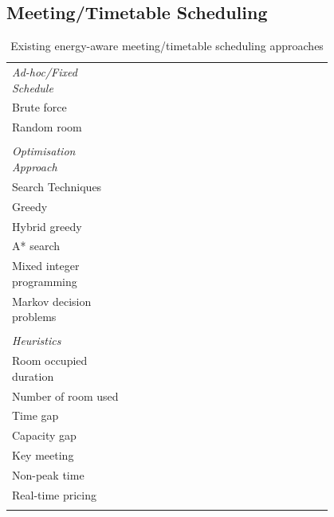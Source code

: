 \subsection{Meeting/Timetable Scheduling}

\begin{table}[t]
\centering
\begin{tabular}{p{0.3\linewidth} p{0.1\linewidth} p{0.08\linewidth}  p{0.08\linewidth} p{0.08\linewidth} p{0.08\linewidth} p{0.08\linewidth}}
\hline\centering{ } & \centering{\cite{majumdar2012energy}} & \centering{\cite{kwak2013tesla}} & \centering{\cite{pan2012thermal}} & \centering{\cite{klein2012coordinating}}  & \centering{\cite{chai2014minimizing}} & \centering{\cite{balaji2013zonepac}}\tabularnewline
\hline  \emph{Ad-hoc/Fixed Schedule} &  &  &  &  &  &  \tabularnewline
\hline  Brute force & \centering{x} &  &  &  &  &  \tabularnewline
\hline  Random room & \centering{x} &  &  & \centering{x} & \centering{x} & \centering{x} \tabularnewline
\hline   &  &  &  &  &  &  \tabularnewline
\hline  \emph{Optimisation Approach} &  &  &  &  &  &  \tabularnewline
\hline  Search Techniques &  &  &  &  &  &  \tabularnewline
\hline  \hspace{5pt} Greedy &  &  & \centering{x} &  &  &  \tabularnewline
\hline  \hspace{5pt} Hybrid greedy & \centering{x} &  &  &  &  &  \tabularnewline
\hline  \hspace{5pt} A* search & \centering{x} &  &  &  &  &  \tabularnewline
\hline  Mixed integer programming &  & \centering{x} &  &  & \centering{x} &  \tabularnewline
\hline  Markov decision problems &  &  &  & \centering{x} &  &  \tabularnewline
\hline   &  &  &  &  &  &  \tabularnewline
\hline  \emph{Heuristics} &  &  &  &  &  &  \tabularnewline
\hline  Room occupied duration & \centering{x} &  &  &  &  &  \tabularnewline
\hline  Number of room used & \centering{x} &  &  & \centering{x} &  &  \tabularnewline
\hline  Time gap & \centering{x} &  & \centering{x} &  & \centering{x} &  \tabularnewline
\hline  Capacity gap & \centering{x} & \centering{x} & \centering{x} &  & \centering{x} &  \tabularnewline
\hline  Key meeting &  & \centering{x} &  &  &  &  \tabularnewline
\hline  Non-peak time &  & \centering{x} &  &  & &  \tabularnewline
\hline  Real-time pricing &  &  & \centering{x} &  & \centering{x} &  \tabularnewline
\hline   &  &  &  &  &  &  \tabularnewline
\end{tabular}
	\caption{Existing energy-aware meeting/timetable scheduling approaches}
	\label{tab:sche_appr}
\end{table}

